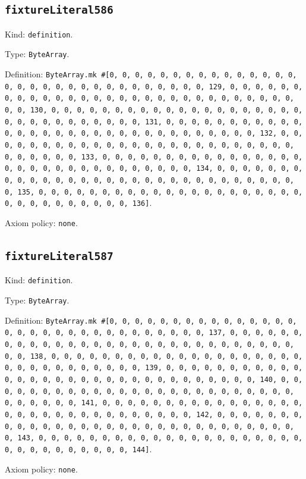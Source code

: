 \documentclass[11pt]{article}
\begin{document}
\subsection*{\texttt{fixtureLiteral586}}
\noindent Kind: \texttt{definition}.\par
\noindent Type: \texttt{ByteArray}.\par
\noindent Definition: \texttt{ByteArray.mk \#[0, 0, 0, 0, 0, 0, 0, 0, 0, 0, 0, 0, 0, 0, 0, 0, 0, 0, 0, 0, 0, 0, 0, 0, 0, 0, 0, 0, 0, 0, 0, 129, 0, 0, 0, 0, 0, 0, 0, 0, 0, 0, 0, 0, 0, 0, 0, 0, 0, 0, 0, 0, 0, 0, 0, 0, 0, 0, 0, 0, 0, 0, 0, 130, 0, 0, 0, 0, 0, 0, 0, 0, 0, 0, 0, 0, 0, 0, 0, 0, 0, 0, 0, 0, 0, 0, 0, 0, 0, 0, 0, 0, 0, 0, 0, 131, 0, 0, 0, 0, 0, 0, 0, 0, 0, 0, 0, 0, 0, 0, 0, 0, 0, 0, 0, 0, 0, 0, 0, 0, 0, 0, 0, 0, 0, 0, 0, 132, 0, 0, 0, 0, 0, 0, 0, 0, 0, 0, 0, 0, 0, 0, 0, 0, 0, 0, 0, 0, 0, 0, 0, 0, 0, 0, 0, 0, 0, 0, 0, 133, 0, 0, 0, 0, 0, 0, 0, 0, 0, 0, 0, 0, 0, 0, 0, 0, 0, 0, 0, 0, 0, 0, 0, 0, 0, 0, 0, 0, 0, 0, 0, 134, 0, 0, 0, 0, 0, 0, 0, 0, 0, 0, 0, 0, 0, 0, 0, 0, 0, 0, 0, 0, 0, 0, 0, 0, 0, 0, 0, 0, 0, 0, 0, 135, 0, 0, 0, 0, 0, 0, 0, 0, 0, 0, 0, 0, 0, 0, 0, 0, 0, 0, 0, 0, 0, 0, 0, 0, 0, 0, 0, 0, 0, 0, 0, 136]}.\par
\noindent Axiom policy: \texttt{none}.\par
\subsection*{\texttt{fixtureLiteral587}}
\noindent Kind: \texttt{definition}.\par
\noindent Type: \texttt{ByteArray}.\par
\noindent Definition: \texttt{ByteArray.mk \#[0, 0, 0, 0, 0, 0, 0, 0, 0, 0, 0, 0, 0, 0, 0, 0, 0, 0, 0, 0, 0, 0, 0, 0, 0, 0, 0, 0, 0, 0, 0, 137, 0, 0, 0, 0, 0, 0, 0, 0, 0, 0, 0, 0, 0, 0, 0, 0, 0, 0, 0, 0, 0, 0, 0, 0, 0, 0, 0, 0, 0, 0, 0, 138, 0, 0, 0, 0, 0, 0, 0, 0, 0, 0, 0, 0, 0, 0, 0, 0, 0, 0, 0, 0, 0, 0, 0, 0, 0, 0, 0, 0, 0, 0, 0, 139, 0, 0, 0, 0, 0, 0, 0, 0, 0, 0, 0, 0, 0, 0, 0, 0, 0, 0, 0, 0, 0, 0, 0, 0, 0, 0, 0, 0, 0, 0, 0, 140, 0, 0, 0, 0, 0, 0, 0, 0, 0, 0, 0, 0, 0, 0, 0, 0, 0, 0, 0, 0, 0, 0, 0, 0, 0, 0, 0, 0, 0, 0, 0, 141, 0, 0, 0, 0, 0, 0, 0, 0, 0, 0, 0, 0, 0, 0, 0, 0, 0, 0, 0, 0, 0, 0, 0, 0, 0, 0, 0, 0, 0, 0, 0, 142, 0, 0, 0, 0, 0, 0, 0, 0, 0, 0, 0, 0, 0, 0, 0, 0, 0, 0, 0, 0, 0, 0, 0, 0, 0, 0, 0, 0, 0, 0, 0, 143, 0, 0, 0, 0, 0, 0, 0, 0, 0, 0, 0, 0, 0, 0, 0, 0, 0, 0, 0, 0, 0, 0, 0, 0, 0, 0, 0, 0, 0, 0, 0, 144]}.\par
\noindent Axiom policy: \texttt{none}.\par
\end{document}
